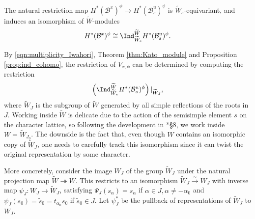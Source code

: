 \begin{proposition}\label{prop:ind_cohomo}\cite{Kato1983}
    The natural restriction map $H^*(\mathcal{B}^x)^\phi\rightarrow H^*(\mathcal{B}_s^u)^\phi$ is $\widetilde{W}_s$-equivariant, and induces an isomorphism of $\widetilde{W}$-modules
    $$H^*(\mathcal{B}^x)^\phi\cong\Ind_{\widetilde{W}_s}^{\widetilde{W}} H^*(\mathcal{B}_s^u)^\phi.$$
\end{proposition}

By \eqref{eqn:multiplicity_Iwahori}, Theorem \ref{thm:Kato_module} and Proposition \ref{prop:ind_cohomo}, the restriction of $V_{x,\phi}$ can be determined by computing the restriction
\begin{equation*}
    \left(\Ind_{\widetilde{W}_s}^{\widetilde{W}}H^*(\mathcal{B}^u_s)^\phi\right)|_{\widetilde{W}_J},
\end{equation*}
where $\widetilde{W}_J$ is the subgroup of $\widetilde{W}$ generated by all simple reflections of the roots in $J$. Working inside $\widetilde{W}$ is delicate due to the action of the semisimple element $s$ on the character lattice, so following the development in \cite{Reeder2000}*{\S 8}, we work inside $W=\widetilde{W}_{J_0}$. The downside is the fact that, even though $W$ contains an isomorphic copy of $\widetilde{W}_J$, one needs to carefully track this isomorphism since it can twist the original representation by some character. 

More concretely, consider the image $W_J$ of the group $\widetilde{W}_J$ under the natural projection map $\widetilde{W}\twoheadrightarrow W$. This restricts to an isomorphism $\widetilde{W}_J\overset{\sim}{\rightarrow} W_J$ with inverse map $\psi_J:W_J\rightarrow \widetilde{W}_J$, satisfying $\Psi_J(s_\alpha)=s_\alpha$ if $\alpha\in J, \alpha\neq-\alpha_0$ and $\psi_J(s_0)=\tilde{s}_0=t_{\alpha_0}s_0$ if $\tilde{s}_0\in J$. Let $\psi_J^*$ be the pullback of representations of $\widetilde{W}_J$ to $W_J$.

